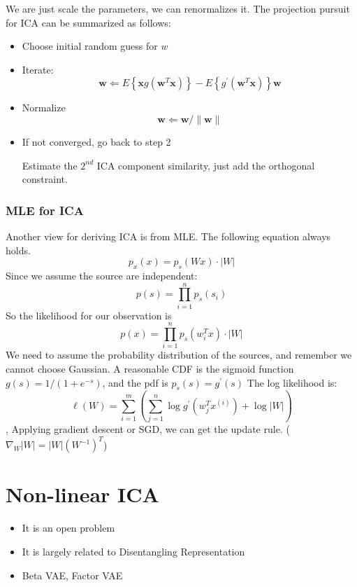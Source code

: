 \documentclass{article}
\begin{document}
We are just scale the parameters, we can renormalizes it.
The projection pursuit for ICA can be summarized as follows:
\begin{itemize}
\item Choose initial random guess for $w$
\item Iterate:
\begin{equation*}
\mathbf{w} \Leftarrow E\left\{\mathbf{x} g\left(\mathbf{w}^{T} \mathbf{x}\right)\right\}-E\left\{g^{\prime}\left(\mathbf{w}^{T} \mathbf{x}\right)\right\} \mathbf{w}
\end{equation*}
\item Normalize
\begin{equation*}
\mathbf{w} \Leftarrow \mathbf{w} /\|\mathbf{w}\|
\end{equation*}
\item If not converged, go back to step 2

Estimate the $2^{nd}$ ICA component similarity, just add the orthogonal constraint.

\end{itemize}

\subsubsection{MLE for ICA}
Another view for deriving ICA is from MLE.
The following equation always holds.
\begin{equation}
p_{x}(x)=p_{s}(W x) \cdot|W|
\end{equation}
Since we assume the source are independent:
\begin{equation}
p(s)=\prod_{i=1}^{n} p_{s}\left(s_{i}\right)
\end{equation}
So the likelihood for our observation is
\begin{equation}
p(x)=\prod_{i=1}^{n} p_{s}\left(w_{i}^{T} x\right) \cdot|W|
\end{equation}
We need to assume the probability distribution of the sources, and remember we cannot choose Gaussian. A reasonable CDF is the sigmoid function $g(s)=1 /\left(1+e^{-s}\right)$, and the pdf is $p_{s}(s)=g^{\prime}(s)$
The log likelihood is:
\begin{equation}
\ell(W)=\sum_{i=1}^{m}\left(\sum_{j=1}^{n} \log g^{\prime}\left(w_{j}^{T} x^{(i)}\right)+\log |W|\right)
\end{equation},
Applying gradient descent or SGD, we can get the update rule. ($\nabla_{W}|W|=|W|\left(W^{-1}\right)^{T}$)

\section{Non-linear ICA}
\begin{itemize}
\item It is an open problem
\item It is largely related to Disentangling Representation
\item Beta VAE, Factor VAE
\end{itemize}
\end{document}
